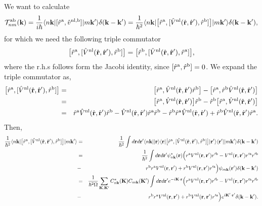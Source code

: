 \documentclass[floatfix,prb,aps,superscriptaddress,11pt,preprint]{revtex4}
\begin{document}
We want to calculate
\begin{eqnarray}\label{3.1}
\calt^{\rma\rmb}_{nm}(\bfk)=\frac{1}{i\hbar}
\bra{n\bfk}
[\hat r^{\rma},\hat v^{\nl,\rmb}]
\ket{m\bfk'}\gd(\bfk-\bfk')
=
\frac{1}{\hbar^2}
\bra{n\bfk}
\big[\hat r^{\rma},[\hat V^\nl(\hat\bfr,\hat\bfr'),\hat r^\rmb]\big]
\ket{m\bfk'}\gd(\bfk-\bfk')
,
\end{eqnarray} 
for which we need the following triple commutator
\begin{eqnarray}\label{3.2}
\big[\hat r^{\rma},[\hat V^\nl(\hat\bfr,\hat\bfr'),\hat r^\rmb]\big]
=
\big[\hat r^{\rmb},[\hat V^\nl(\hat\bfr,\hat\bfr'),\hat r^\rma]\big]
,
\end{eqnarray} 
where the r.h.s follows form the Jacobi identity, since $[\hat
r^\rma,\hat r^\rmb]=0$.
 We expand  the triple commutator as,
\begin{eqnarray}\label{3.3}
\big[\hat r^{\rma},[\hat V^\nl(\hat\bfr,\hat\bfr'),\hat r^\rmb]\big]
&=&
\big[\hat r^{\rma},
\hat V^\nl(\hat\bfr,\hat\bfr')\hat r^\rmb
\big]
-
\big[\hat r^{\rma},
\hat r^\rmb\hat V^\nl(\hat\bfr,\hat\bfr')
\big]
\nonumber\\
&=&
\big[\hat r^{\rma},
\hat V^\nl(\hat\bfr,\hat\bfr')
\big]\hat r^\rmb
-
\hat r^\rmb
\big[\hat r^{\rma},
\hat V^\nl(\hat\bfr,\hat\bfr')
\big]
\nonumber\\
&=&
\hat r^{\rma}
\hat V^\nl(\hat\bfr,\hat\bfr')
\hat r^\rmb
-
\hat V^\nl(\hat\bfr,\hat\bfr')
\hat r^\rma
\hat r^{\rmb}
-
\hat r^\rmb
\hat r^{\rma}
\hat V^\nl(\hat\bfr,\hat\bfr')
+
\hat r^\rmb
\hat V^\nl(\hat\bfr,\hat\bfr')
\hat r^{\rma}
.
\end{eqnarray}
Then,
\begin{eqnarray}\label{3.5}
\frac{1}{\hbar^2}
\bra{n\bfk}
\big[\hat r^{\rma},[\hat V^\nl(\hat\bfr,\hat\bfr'),\hat r^\rmb]\big]
\ket{m\bfk'}
&=&
\frac{1}{\hbar^2}
\int d\bfr d\bfr'
\bra{n\bfk}
\ket{\bfr}\bra{\bfr}
\big[\hat r^{\rma},[\hat V^\nl(\hat\bfr,\hat\bfr'),\hat r^\rmb]\big]
\ket{\bfr'}\bra{\bfr'}
\ket{m\bfk'}\gd(\bfk-\bfk')
\nonumber\\
&=&
\frac{1}{\hbar^2}
\int d\bfr d\bfr'
\psi^*_{n\bfk}(\bfr)
\Big(
r^{\rma}
V^\nl(\bfr,\bfr')
r'^\rmb
-
V^\nl(\bfr,\bfr')
r'^\rma
r'^{\rmb}
\nonumber\\
&-&
r^\rmb
r^{\rma}
V^\nl(\bfr,\bfr')
+
 r^\rmb
V^\nl(\bfr,\bfr')
r'^{\rma}
\Big) 
\psi_{m\bfk}(\bfr')
\gd(\bfk-\bfk')
\nonumber\\
&=&
\frac{1}{\hbar^2\gO}
\sum_{\bfK,\bfK'} 
C^*_{n\bfk}(\bfK) 
C_{m\bfk}(\bfK')
\int
d\bfr d\bfr'
 e^{-i\bfK\cdot\bfr}
\Big(
r^{\rma}
V^\nl(\bfr,\bfr')
r'^\rmb
-
V^\nl(\bfr,\bfr')
r'^\rma
r'^{\rmb}
\nonumber\\
&-&
r^\rmb
r^{\rma}
V^\nl(\bfr,\bfr')
+
 r^\rmb
V^\nl(\bfr,\bfr')
r'^{\rma}
\Big) 
 e^{i\bfK'\cdot\bfr'}
\gd(\bfk-\bfk')
.
\end{eqnarray} 
\end{document}
